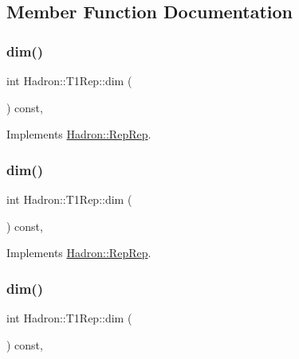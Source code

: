 \subsection{Member Function Documentation}
\mbox{\label{structHadron_1_1T1Rep_aa5fae2d46d90d11f94ed0b78626e7758}} 
\subsubsection{\texorpdfstring{dim()}{dim()}\hspace{0.1cm}{\footnotesize\ttfamily [1/5]}}
{\footnotesize\ttfamily int Hadron\+::\+T1\+Rep\+::dim (\begin{DoxyParamCaption}{ }\end{DoxyParamCaption}) const\hspace{0.3cm}{\ttfamily [inline]}, {\ttfamily [virtual]}}



Implements \mbox{\hyperlink{structHadron_1_1RepRep_a92c8802e5ed7afd7da43ccfd5b7cd92b}{Hadron\+::\+Rep\+Rep}}.

\mbox{\label{structHadron_1_1T1Rep_aa5fae2d46d90d11f94ed0b78626e7758}} 
\subsubsection{\texorpdfstring{dim()}{dim()}\hspace{0.1cm}{\footnotesize\ttfamily [2/5]}}
{\footnotesize\ttfamily int Hadron\+::\+T1\+Rep\+::dim (\begin{DoxyParamCaption}{ }\end{DoxyParamCaption}) const\hspace{0.3cm}{\ttfamily [inline]}, {\ttfamily [virtual]}}



Implements \mbox{\hyperlink{structHadron_1_1RepRep_a92c8802e5ed7afd7da43ccfd5b7cd92b}{Hadron\+::\+Rep\+Rep}}.

\mbox{\label{structHadron_1_1T1Rep_aa5fae2d46d90d11f94ed0b78626e7758}} 
\subsubsection{\texorpdfstring{dim()}{dim()}\hspace{0.1cm}{\footnotesize\ttfamily [3/5]}}
{\footnotesize\ttfamily int Hadron\+::\+T1\+Rep\+::dim (\begin{DoxyParamCaption}{ }\end{DoxyParamCaption}) const\hspace{0.3cm}{\ttfamily [inline]}, {\ttfamily [virtual]}}



